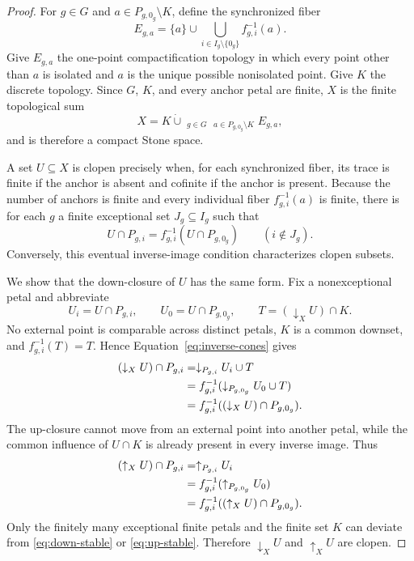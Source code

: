 \documentclass[11pt]{article}
\theoremstyle{remark}
\numberwithin{equation}{section}
\begin{document}
\begin{proof}
For $g\in G$ and $a\in P_{g,0_g}\setminus K$, define the synchronized fiber
\begin{equation}
E_{g,a}=\{a\}\cup
\bigcup_{i\in I_g\setminus\{0_g\}}f_{g,i}^{-1}(a).
\label{eq:fiber}
\end{equation}
Give $E_{g,a}$ the one-point compactification topology in which every point
other than $a$ is isolated and $a$ is the unique possible nonisolated point.
Give $K$ the discrete topology. Since $G$, $K$, and every anchor petal are
finite, $X$ is the finite topological sum
\begin{equation}
X=K\mathbin{\dot\cup}
\mathop{\dot\bigcup}_{g\in G}
\mathop{\dot\bigcup}_{a\in P_{g,0_g}\setminus K}E_{g,a},
\label{eq:sum}
\end{equation}
and is therefore a compact Stone space.

A set $U\subseteq X$ is clopen precisely when, for each synchronized fiber,
its trace is finite if the anchor is absent and cofinite if the anchor is
present. Because the number of anchors is finite and every individual fiber
$f_{g,i}^{-1}(a)$ is finite, there is for each $g$ a finite exceptional set
$J_g\subseteq I_g$ such that
\begin{equation}
U\cap P_{g,i}
=f_{g,i}^{-1}(U\cap P_{g,0_g})
\qquad(i\notin J_g).
\label{eq:stable}
\end{equation}
Conversely, this eventual inverse-image condition characterizes clopen
subsets.

We show that the down-closure of $U$ has the same form. Fix a nonexceptional
petal and abbreviate
\[
U_i=U\cap P_{g,i},\qquad U_0=U\cap P_{g,0_g},
\qquad
T=(\downarrow_XU)\cap K.
\]
No external point is comparable across distinct petals, $K$ is a common
downset, and $f_{g,i}^{-1}(T)=T$. Hence
Equation~\eqref{eq:inverse-cones} gives
\begin{align}
(\downarrow_XU)\cap P_{g,i}
&=\downarrow_{P_{g,i}}U_i\cup T \notag\\
&=f_{g,i}^{-1}
  (\downarrow_{P_{g,0_g}}U_0\cup T) \notag\\
&=f_{g,i}^{-1}
  ((\downarrow_XU)\cap P_{g,0_g}).
\label{eq:down-stable}
\end{align}
The up-closure cannot move from an external point into another petal, while
the common influence of $U\cap K$ is already present in every inverse image.
Thus
\begin{align}
(\uparrow_XU)\cap P_{g,i}
&=\uparrow_{P_{g,i}}U_i \notag\\
&=f_{g,i}^{-1}(\uparrow_{P_{g,0_g}}U_0) \notag\\
&=f_{g,i}^{-1}((\uparrow_XU)\cap P_{g,0_g}).
\label{eq:up-stable}
\end{align}
Only the finitely many exceptional finite petals and the finite set $K$ can
deviate from \eqref{eq:down-stable} or \eqref{eq:up-stable}. Therefore
$\downarrow_XU$ and $\uparrow_XU$ are clopen.


\end{proof}
\end{document}
